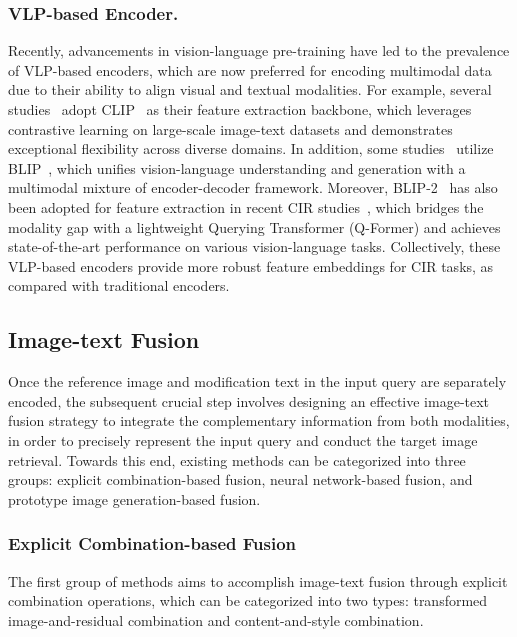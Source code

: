 \subsubsection{VLP-based Encoder.}
Recently, advancements in vision-language pre-training have led to the prevalence of VLP-based encoders, which are now preferred for encoding multimodal data due to their ability to align visual and textual modalities. For example, several studies~\cite{chen2024spirit,wen2023tgcir,yang2024ssn,xu2024alret,baldrati2022CLIP4CIR,zhao2022PL4CIR,chen2023ranking,lin2023clip_cd,wen2024dqu,wan2024caff} adopt CLIP~\cite{radford2021learning} as their feature extraction backbone, which leverages contrastive learning on large-scale image-text datasets and demonstrates exceptional flexibility across diverse domains. In addition, some studies~\cite{liu2023rerank,liu2024blip4cir,levy2024case} utilize BLIP~\cite{li2022blip}, which unifies vision-language understanding and generation with a multimodal mixture of encoder-decoder framework.
Moreover, BLIP-2~\cite{li2023blip2} has also been adopted for feature extraction in recent CIR studies~\cite{xusentence2024sprc, xu2024SDQUR}, which bridges the modality gap with a lightweight Querying Transformer (Q-Former) and achieves state-of-the-art performance on various vision-language tasks.
Collectively, these VLP-based encoders provide more robust feature embeddings for CIR tasks, as compared with traditional encoders. 

\subsection{Image-text Fusion}
Once the reference image and modification text in the input query are separately encoded, the subsequent crucial step involves designing an effective image-text fusion strategy to integrate the complementary information from both modalities, in order to precisely represent the input query and conduct the target image retrieval. Towards this end, existing methods can be categorized into three groups: explicit combination-based fusion, neural network-based fusion, and prototype image generation-based fusion.

\subsubsection{Explicit Combination-based Fusion}
The first group of methods aims to accomplish image-text fusion through explicit combination operations, which can be categorized into two types: transformed image-and-residual combination and content-and-style combination.

